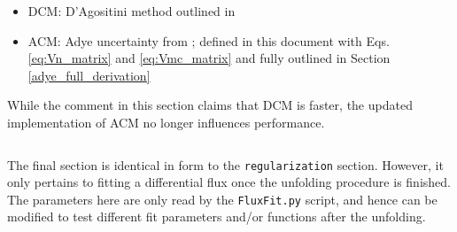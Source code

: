 \begin{itemize}
  \item DCM: D'Agositini method outlined in \cite{agostini}
  \item ACM: Adye uncertainty from \cite{adye2}; defined in this document with Eqs. \ref{eq:Vn_matrix} and \ref{eq:Vmc_matrix} and fully outlined in Section \ref{adye_full_derivation}
\end{itemize}

While the comment in this section claims that DCM is faster, the updated implementation of ACM no longer influences performance.


\noindent\hrulefill

\inputminted[firstline=64,lastline=80]{ini}{code/unfoldConfig.cfg}
The final section is identical in form to the \verb|regularization| section.
However, it only pertains to fitting a differential flux once the unfolding procedure is finished.
The parameters here are only read by the \verb|FluxFit.py| script, and hence
can be modified to test different fit parameters and/or functions after the unfolding.

